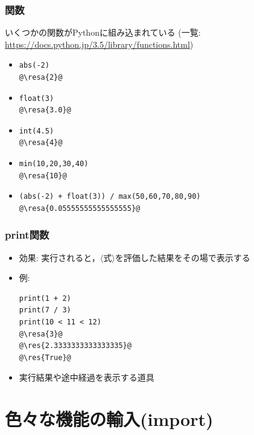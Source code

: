 \documentclass[10pt,dvipdfmx]{beamer}
\newcommand{\ore}[1]{{\color{orange}#1}}
\newcommand{\resa}[1]{\ore{\textsl{$\rightarrow$ #1}}}
\newcommand{\res}[1]{\ore{\textsl{#1}}}
\begin{document}
\begin{frame}[fragile]
\frametitle{関数}
いくつかの関数がPythonに組み込まれている
(一覧: \url{https://docs.python.jp/3.5/library/functions.html})

\begin{itemize}
\item
\begin{lstlisting}
abs(-2)
@\resa{2}@
\end{lstlisting}

\item
\begin{lstlisting}
float(3)
@\resa{3.0}@
\end{lstlisting}

\item
\begin{lstlisting}
int(4.5)
@\resa{4}@
\end{lstlisting}

\item
\begin{lstlisting}
min(10,20,30,40)
@\resa{10}@
\end{lstlisting}

\item
\begin{lstlisting}
(abs(-2) + float(3)) / max(50,60,70,80,90)
@\resa{0.05555555555555555}@
\end{lstlisting}

\end{itemize}
\end{frame}

\begin{frame}[fragile]
\frametitle{print関数}
\begin{itemize}
\item 効果:
実行されると，$\langle$式$\rangle$を評価した結果をその場で表示する
\item 例:
\begin{lstlisting}
print(1 + 2)
print(7 / 3)
print(10 < 11 < 12)
@\resa{3}@
@\res{2.3333333333333335}@
@\res{True}@
\end{lstlisting}

\item 実行結果や途中経過を表示する道具

\end{itemize}
\end{frame}


\section{色々な機能の輸入(import)}
\end{document}
